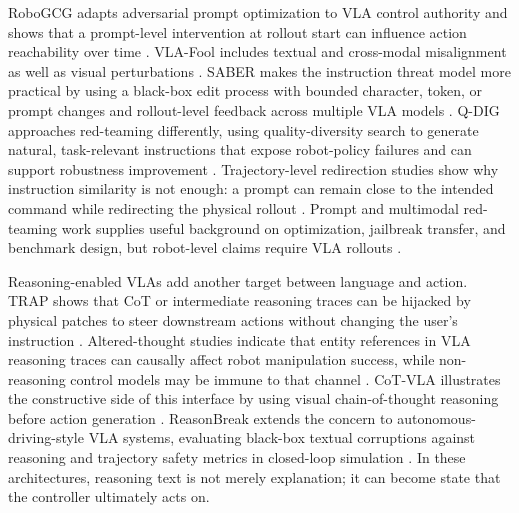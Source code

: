 RoboGCG adapts adversarial prompt optimization to VLA control authority and shows that a prompt-level intervention at rollout start can influence action reachability over time \cite{jones2025robogcg}. VLA-Fool includes textual and cross-modal misalignment as well as visual perturbations \cite{yan2025vlafool}. SABER makes the instruction threat model more practical by using a black-box edit process with bounded character, token, or prompt changes and rollout-level feedback across multiple VLA models \cite{wu2026saber}. Q-DIG approaches red-teaming differently, using quality-diversity search to generate natural, task-relevant instructions that expose robot-policy failures and can support robustness improvement \cite{srikanth2026qdig}. Trajectory-level redirection studies show why instruction similarity is not enough: a prompt can remain close to the intended command while redirecting the physical rollout \cite{puthumanaillam2026trajectory}. Prompt and multimodal red-teaming work supplies useful background on optimization, jailbreak transfer, and benchmark design, but robot-level claims require VLA rollouts \cite{perez2022ignore,wei2023jailbroken,chao2023pair,liu2024autodan,mazeika2024harmbench} \cite{shen2024dan,mehrotra2024tap,zhu2023promptbench,li2023deepinception,paulus2025advprompter}.

Reasoning-enabled VLAs add another target between language and action. TRAP shows that CoT or intermediate reasoning traces can be hijacked by physical patches to steer downstream actions without changing the user's instruction \cite{huang2026trap}. Altered-thought studies indicate that entity references in VLA reasoning traces can causally affect robot manipulation success, while non-reasoning control models may be immune to that channel \cite{altered2026thoughts}. CoT-VLA illustrates the constructive side of this interface by using visual chain-of-thought reasoning before action generation \cite{zhao2025cotvla}. ReasonBreak extends the concern to autonomous-driving-style VLA systems, evaluating black-box textual corruptions against reasoning and trajectory safety metrics in closed-loop simulation \cite{teymoorianfard2026reasonbreak}. In these architectures, reasoning text is not merely explanation; it can become state that the controller ultimately acts on.

